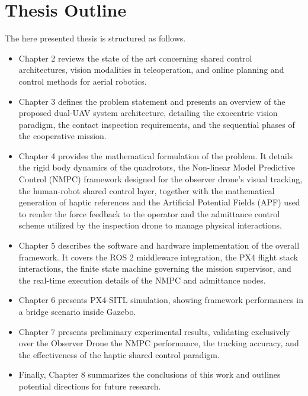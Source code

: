 \section{Thesis Outline}
The here presented thesis  is structured as follows.
\begin{itemize}
    \item Chapter 2 reviews the state of the art concerning shared control architectures, vision modalities in teleoperation, and online planning and control methods for aerial robotics. 
    \item Chapter 3 defines the problem statement and presents an overview of the proposed dual-UAV system architecture, detailing the exocentric vision paradigm, the contact inspection requirements, and the sequential phases of the cooperative mission. 
    \item Chapter 4 provides the mathematical formulation of the problem. It details the rigid body dynamics of the quadrotors, the Non-linear Model Predictive Control (NMPC) framework designed for the observer drone's visual tracking, the human-robot shared control layer, together with the mathematical generation of haptic references and the Artificial Potential Fields (APF) used to render the force feedback to the operator and the admittance control scheme utilized by the inspection drone to manage physical interactions.
    \item Chapter 5 describes the software and hardware implementation of the overall framework. It covers the ROS 2 middleware integration, the PX4 flight stack interactions, the finite state machine governing the mission supervisor, and the real-time execution details of the NMPC and admittance nodes.
    \item Chapter 6 presents PX4-SITL simulation, showing framework performances in a bridge scenario inside Gazebo. 
    \item Chapter 7 presents preliminary experimental results, validating exclusively over the Observer Drone the NMPC performance, the tracking accuracy, and the effectiveness of the haptic shared control paradigm.
    \item Finally, Chapter 8 summarizes the conclusions of this work and outlines potential directions for future research.
\end{itemize}  
   